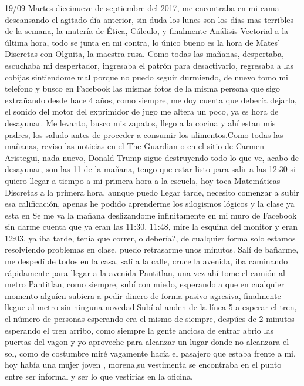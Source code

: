 \documentclass[letterpaper]{article}
\newcommand{\titlehomework}[4]{\begin{center}\section*{#4}{\large #2}\\#1\\#3\\[2ex]\end{center}}
\begin{document}
19/09
Martes diecinueve de septiembre del 2017, me encontraba en mi cama descansando el agitado día
anterior, sin duda los lunes son los días mas terribles de la semana, la matería de Ética, Cálculo,
y finalmente Análisis Vectorial a la última hora, todo se junta en mi contra, lo único bueno es la
hora de Mates' Discretas con Olguita, la maestra rusa. Como todas las mañanas, despertaba, escuchaba
mi despertador, ingresaba el patrón para desactivarlo, regresaba a las cobijas sintiendome mal
porque no puedo seguir durmiendo, de nuevo tomo mi telefono y busco en Facebook las mismas fotos de
la misma persona que sigo extrañando desde hace 4 años, como siempre, me doy cuenta que debería
dejarlo, el sonido del motor del exprimidor de jugo me altera un poco, ya es hora de desayunar. Me
levanto, busco mis zapatos, llego a la cocina y ahí estan mis padres, los saludo antes de proceder a
consumir los alimentos.Como todas las mañanas, reviso las noticias en el The Guardian o en el sitio
de Carmen Aristegui, nada nuevo, Donald Trump sigue destruyendo todo lo que ve, %
acabo de desayunar, son las 11 de la mañana, tengo que estar listo para salir a las 12:30 si quiero
llegar a tiempo a mi primera hora a la escuela, hoy toca Matemáticas Discretas a la primera hora,
aunque puedo llegar tarde, necesito comenzar a subir esa calificación, apenas he podido aprenderme
los silogismos lógicos y la clase ya esta en %
Se me va la mañana deslizandome infinitamente en mi muro de Facebook sin darme cuenta que ya eran
las 11:30, 11:48, mire la esquina del monitor y eran 12:03, ya iba tarde, tenía que correr, o
debería?, de cualquier forma solo estamos resolviendo problemas en clase, puedo retrasarme unos
minutos. Salí de bañarme, me despedí de todos en la casa, salí a la calle, cruce la avenida, iba
caminando rápidamente para llegar a la avenida Pantitlan, una vez ahí tome el camión al metro
Pantitlan, como siempre, subí con miedo, esperando a que en cualquier momento alguíen subiera a
pedir dinero de forma pasivo-agresiva, finalmente llegue al metro sin ninguna novedad.Subí al anden
de la línea 5 a esperar el tren, el número de personas esperando era el mismo de siempre, despúes de
2 minutos esperando el tren arribo, como siempre la gente anciosa de entrar abrio las puertas del
vagon y yo aproveche para alcanzar un lugar donde no alcanzara el sol, como de costumbre miré
vagamente hacía el pasajero que estaba frente a mi, hoy había una mujer joven , morena,su
vestimenta se encontraba en el punto entre ser informal y ser lo que vestirias en la oficina,
\end{document}
